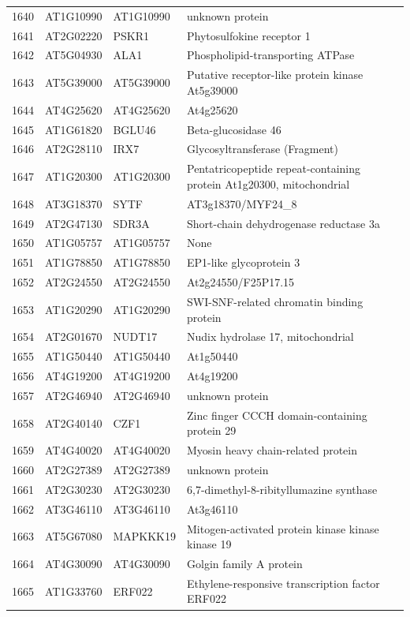 \documentclass[11pt]{article}
\begin{document}
\begin{center}
\begin{tabular}{rlll}
1640 & AT1G10990 & AT1G10990 & unknown protein\\
1641 & AT2G02220 & PSKR1 & Phytosulfokine receptor 1\\
1642 & AT5G04930 & ALA1 & Phospholipid-transporting ATPase\\
1643 & AT5G39000 & AT5G39000 & Putative receptor-like protein kinase At5g39000\\
1644 & AT4G25620 & AT4G25620 & At4g25620\\
1645 & AT1G61820 & BGLU46 & Beta-glucosidase 46\\
1646 & AT2G28110 & IRX7 & Glycosyltransferase (Fragment)\\
1647 & AT1G20300 & AT1G20300 & Pentatricopeptide repeat-containing protein At1g20300, mitochondrial\\
1648 & AT3G18370 & SYTF & AT3g18370/MYF24\_8\\
1649 & AT2G47130 & SDR3A & Short-chain dehydrogenase reductase 3a\\
1650 & AT1G05757 & AT1G05757 & None\\
1651 & AT1G78850 & AT1G78850 & EP1-like glycoprotein 3\\
1652 & AT2G24550 & AT2G24550 & At2g24550/F25P17.15\\
1653 & AT1G20290 & AT1G20290 & SWI-SNF-related chromatin binding protein\\
1654 & AT2G01670 & NUDT17 & Nudix hydrolase 17, mitochondrial\\
1655 & AT1G50440 & AT1G50440 & At1g50440\\
1656 & AT4G19200 & AT4G19200 & At4g19200\\
1657 & AT2G46940 & AT2G46940 & unknown protein\\
1658 & AT2G40140 & CZF1 & Zinc finger CCCH domain-containing protein 29\\
1659 & AT4G40020 & AT4G40020 & Myosin heavy chain-related protein\\
1660 & AT2G27389 & AT2G27389 & unknown protein\\
1661 & AT2G30230 & AT2G30230 & 6,7-dimethyl-8-ribityllumazine synthase\\
1662 & AT3G46110 & AT3G46110 & At3g46110\\
1663 & AT5G67080 & MAPKKK19 & Mitogen-activated protein kinase kinase kinase 19\\
1664 & AT4G30090 & AT4G30090 & Golgin family A protein\\
1665 & AT1G33760 & ERF022 & Ethylene-responsive transcription factor ERF022\\

\end{tabular}
\end{center}
\end{document}
